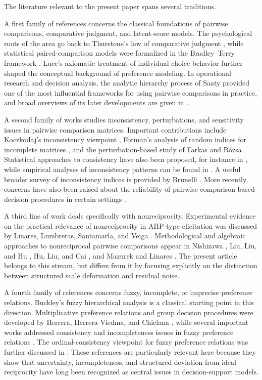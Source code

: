 \documentclass[11pt]{amsart}
\theoremstyle{definition}
\theoremstyle{plain}
\numberwithin{equation}{section}
\begin{document}
The literature relevant to the present paper spans several traditions.

A first family of references concerns the classical foundations of pairwise comparisons, comparative judgment, and latent-score models. The psychological roots of the area go back to Thurstone's law of comparative judgment \cite{Thurstone1927}, while statistical paired-comparison models were formalized in the Bradley--Terry framework \cite{BradleyTerry1952}. Luce's axiomatic treatment of individual choice behavior \cite{Luce1959} further shaped the conceptual background of preference modeling. In operational research and decision analysis, the analytic hierarchy process of Saaty \cite{Saaty1977,Saaty1990} provided one of the most influential frameworks for using pairwise comparisons in practice, and broad overviews of its later developments are given in \cite{IshizakaLabib2011}.

A second family of works studies inconsistency, perturbations, and sensitivity issues in pairwise comparison matrices. Important contributions include Koczkodaj's inconsistency viewpoint \cite{Koczkodaj1993}, Forman's analysis of random indices for incomplete matrices \cite{Forman1990}, and the perturbation-based study of Farkas and R\'ozsa \cite{FarkasRozsa2001}. Statistical approaches to consistency have also been proposed, for instance in \cite{AlonsoLamata2005}, while empirical analyses of inconsistency patterns can be found in \cite{BozokiEtAl2013}. A useful broader survey of inconsistency indices is provided by Brunelli \cite{Brunelli2018}. More recently, concerns have also been raised about the reliability of pairwise-comparison-based decision procedures in certain settings \cite{TriantaphyllouYanase2024}.

A third line of work deals specifically with nonreciprocity. Experimental evidence on the practical relevance of nonreciprocity in AHP-type elicitation was discussed by Linares, Lumbreras, Santamar\'{\i}a, and Veiga \cite{LinaresEtAl2016}. Methodological and algebraic approaches to nonreciprocal pairwise comparisons appear in Nishizawa \cite{Nishizawa2019}, Liu, Liu, and Hu \cite{LiuLiuHu2023}, Hu, Liu, and Cai \cite{HuLiuCai2024}, and Mazurek and Linares \cite{MazurekLinares2024}. The present article belongs to this stream, but differs from it by focusing explicitly on the distinction between structured scale deformation and residual noise.

A fourth family of references concerns fuzzy, incomplete, or imprecise preference relations. Buckley's fuzzy hierarchical analysis \cite{Buckley1985} is a classical starting point in this direction. Multiplicative preference relations and group decision procedures were developed by Herrera, Herrera-Viedma, and Chiclana \cite{HerreraViedmaEtAl2001}, while several important works addressed consistency and incompleteness issues in fuzzy preference relations \cite{HerreraViedmaEtAl2004,HerreraViedmaEtAl2007}. The ordinal-consistency viewpoint for fuzzy preference relations was further discussed in \cite{XuPatnayakuniWang2013}. These references are particularly relevant here because they show that uncertainty, incompleteness, and structured deviation from ideal reciprocity have long been recognized as central issues in decision-support models.
\end{document}
